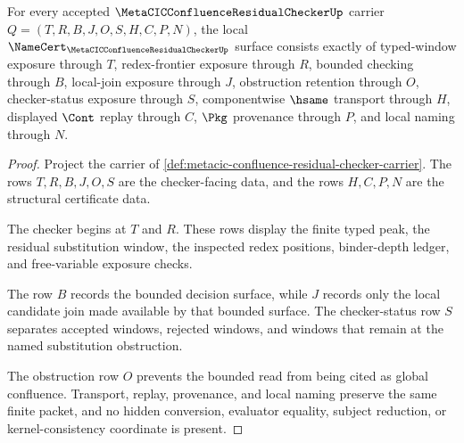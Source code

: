 \begin{theorem}
\label{thm:metacic-confluence-residual-checker-obligations}
For every accepted $\MetaCICConfluenceResidualCheckerUp$ carrier $Q=(T,R,B,J,O,S,H,C,P,N)$, the local $\NameCert_{\MetaCICConfluenceResidualCheckerUp}$ surface consists exactly of typed-window exposure through $T$, redex-frontier exposure through $R$, bounded checking through $B$, local-join exposure through $J$, obstruction retention through $O$, checker-status exposure through $S$, componentwise $\hsame$ transport through $H$, displayed $\Cont$ replay through $C$, $\Pkg$ provenance through $P$, and local naming through $N$.
\end{theorem}
\begin{proof}
Project the carrier of \autoref{def:metacic-confluence-residual-checker-carrier}. The rows $T,R,B,J,O,S$ are the checker-facing data, and the rows $H,C,P,N$ are the structural certificate data.

The checker begins at $T$ and $R$. These rows display the finite typed peak, the residual substitution window, the inspected redex positions, binder-depth ledger, and free-variable exposure checks.

The row $B$ records the bounded decision surface, while $J$ records only the local candidate join made available by that bounded surface. The checker-status row $S$ separates accepted windows, rejected windows, and windows that remain at the named substitution obstruction.

The obstruction row $O$ prevents the bounded read from being cited as global confluence. Transport, replay, provenance, and local naming preserve the same finite packet, and no hidden conversion, evaluator equality, subject reduction, or kernel-consistency coordinate is present.
\end{proof}

